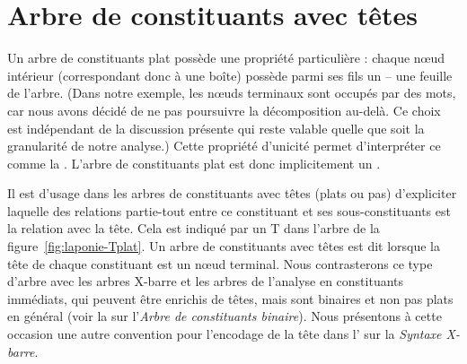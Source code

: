 \section{Arbre de constituants avec têtes}\label{sec:3.4.4}

Un arbre de constituants plat possède une propriété particulière : chaque nœud intérieur (correspondant donc à une boîte) possède parmi ses fils un   – une feuille de l’arbre. (Dans notre exemple, les nœuds terminaux sont occupés par des mots, car nous avons décidé de ne pas poursuivre la décomposition au-delà. Ce choix est indépendant de la discussion présente qui reste valable quelle que soit la granularité de notre analyse.) Cette propriété d’unicité permet d’interpréter ce   comme la . L’arbre de constituants plat est donc implicitement un .

Il est d’usage dans les arbres de constituants avec têtes (plats ou pas) d’expliciter laquelle des relations partie-tout entre ce constituant et ses sous-constituants est la relation avec la tête. Cela est indiqué par un T dans l'arbre de la figure~\ref{fig:laponie-Tplat}. Un arbre de constituants avec têtes est dit  lorsque la tête de chaque constituant est un nœud terminal. Nous contrasterons ce type d’arbre avec les arbres X-barre et les arbres de l’analyse en constituants immédiats, qui peuvent être enrichis de têtes, mais sont binaires et non pas plats en général (voir la  sur l’\textit{Arbre de constituants binaire}). Nous présentons à cette occasion une autre convention pour l’encodage de la tête dans l’ sur la \textit{Syntaxe X-barre}.

